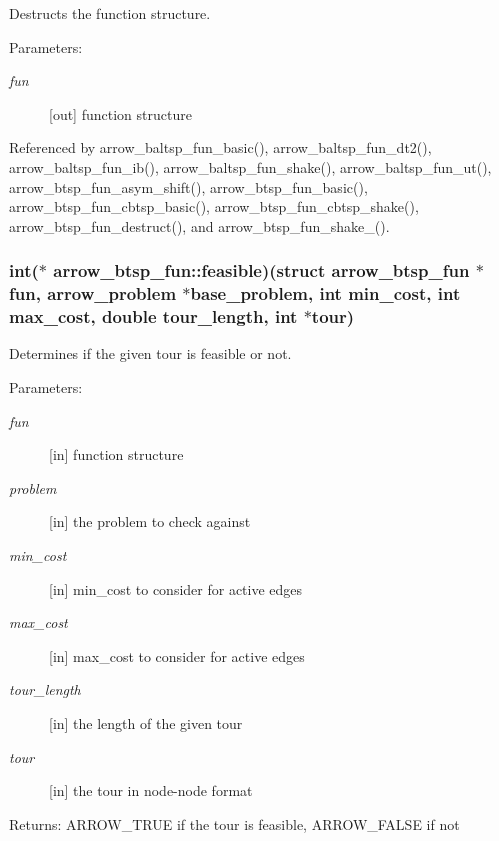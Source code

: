 Destructs the function structure. 

\begin{Desc}
\item[Parameters:]
\begin{description}
\item[{\em fun}]\mbox{[}out\mbox{]} function structure \end{description}
\end{Desc}


Referenced by arrow\_\-baltsp\_\-fun\_\-basic(), arrow\_\-baltsp\_\-fun\_\-dt2(), arrow\_\-baltsp\_\-fun\_\-ib(), arrow\_\-baltsp\_\-fun\_\-shake(), arrow\_\-baltsp\_\-fun\_\-ut(), arrow\_\-btsp\_\-fun\_\-asym\_\-shift(), arrow\_\-btsp\_\-fun\_\-basic(), arrow\_\-btsp\_\-fun\_\-cbtsp\_\-basic(), arrow\_\-btsp\_\-fun\_\-cbtsp\_\-shake(), arrow\_\-btsp\_\-fun\_\-destruct(), and arrow\_\-btsp\_\-fun\_\-shake\_().\hypertarget{structarrow__btsp__fun_98369e55806c13b3ba90c8c1cbe1f8a4}{
\subsubsection[{feasible}]{\setlength{\rightskip}{0pt plus 5cm}int($\ast$ {\bf arrow\_\-btsp\_\-fun::feasible})(struct {\bf arrow\_\-btsp\_\-fun} $\ast$fun, {\bf arrow\_\-problem} $\ast$base\_\-problem, int min\_\-cost, int max\_\-cost, double tour\_\-length, int $\ast$tour)}}
\label{structarrow__btsp__fun_98369e55806c13b3ba90c8c1cbe1f8a4}


Determines if the given tour is feasible or not. 

\begin{Desc}
\item[Parameters:]
\begin{description}
\item[{\em fun}]\mbox{[}in\mbox{]} function structure \item[{\em problem}]\mbox{[}in\mbox{]} the problem to check against \item[{\em min\_\-cost}]\mbox{[}in\mbox{]} min\_\-cost to consider for active edges \item[{\em max\_\-cost}]\mbox{[}in\mbox{]} max\_\-cost to consider for active edges \item[{\em tour\_\-length}]\mbox{[}in\mbox{]} the length of the given tour \item[{\em tour}]\mbox{[}in\mbox{]} the tour in node-node format \end{description}
\end{Desc}
\begin{Desc}
\item[Returns:]ARROW\_\-TRUE if the tour is feasible, ARROW\_\-FALSE if not \end{Desc}



